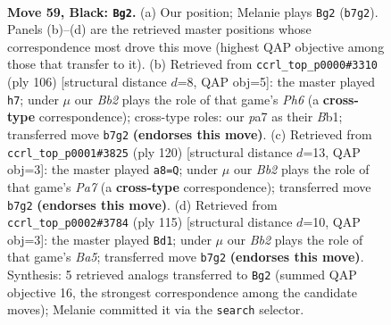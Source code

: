 \documentclass[11pt]{article}
\begin{document}
\clearpage

\begin{figure}[p]\centering
\begin{subfigure}{0.46\textwidth}\centering
\resizebox{\linewidth}{!}{%
\newchessgame
\chessboard[
  setfen={4N3/Pb2PK2/8/2k5/7r/8/5p2/8 b - - 0 59},
  showmover=false,
  pgfstyle=straightmove, color=movearrow, markmove={b7-g2}
]}
\caption{}
\end{subfigure}\hfill
\begin{subfigure}{0.46\textwidth}\centering
\resizebox{\linewidth}{!}{%
\newchessgame
\chessboard[
  setfen={8/8/4pk1P/4n3/8/6K1/8/1B6 w - - 3 54},
  showmover=false,
  pgfstyle=straightmove, color=movearrow, markmove={h6-h7}
]}
\caption{}
\end{subfigure}
\\[4pt]
\begin{subfigure}{0.46\textwidth}\centering
\resizebox{\linewidth}{!}{%
\newchessgame
\chessboard[
  setfen={8/P7/8/3p4/8/1K1pk3/5n2/8 w - - 0 61},
  showmover=false,
  pgfstyle=straightmove, color=movearrow, markmove={a7-a8}
]}
\caption{}
\end{subfigure}\hfill
\begin{subfigure}{0.46\textwidth}\centering
\resizebox{\linewidth}{!}{%
\newchessgame
\chessboard[
  setfen={8/8/8/4k3/b6P/4KP2/4N3/8 b - - 14 58},
  showmover=false,
  pgfstyle=straightmove, color=movearrow, markmove={a4-d1}
]}
\caption{}
\end{subfigure}
\caption{\textbf{Move 59, Black: \texttt{Bg2}.} (a) Our position; Melanie plays \texttt{Bg2} (\texttt{b7g2}). Panels (b)--(d) are the retrieved master positions whose correspondence most drove this move (highest QAP objective among those that transfer to it). (b) Retrieved from \texttt{ccrl\_top\_p0000\#3310} (ply 106) [structural distance $d$=8, QAP obj=5]: the master played \texttt{h7}; under $\mu$ our \emph{Bb2} plays the role of that game's \emph{Ph6} (a \textbf{cross-type} correspondence); cross-type roles: our \emph{p}a7 as their \emph{B}b1; transferred move \texttt{b7g2} \textbf{(endorses this move)}. (c) Retrieved from \texttt{ccrl\_top\_p0001\#3825} (ply 120) [structural distance $d$=13, QAP obj=3]: the master played \texttt{a8=Q}; under $\mu$ our \emph{Bb2} plays the role of that game's \emph{Pa7} (a \textbf{cross-type} correspondence); transferred move \texttt{b7g2} \textbf{(endorses this move)}. (d) Retrieved from \texttt{ccrl\_top\_p0002\#3784} (ply 115) [structural distance $d$=10, QAP obj=3]: the master played \texttt{Bd1}; under $\mu$ our \emph{Bb2} plays the role of that game's \emph{Ba5}; transferred move \texttt{b7g2} \textbf{(endorses this move)}. Synthesis: 5 retrieved analogs transferred to \texttt{Bg2} (summed QAP objective 16, the strongest correspondence among the candidate moves); Melanie committed it via the \texttt{search} selector.}
\label{fig:thought-m117}
\end{figure}
\end{document}
